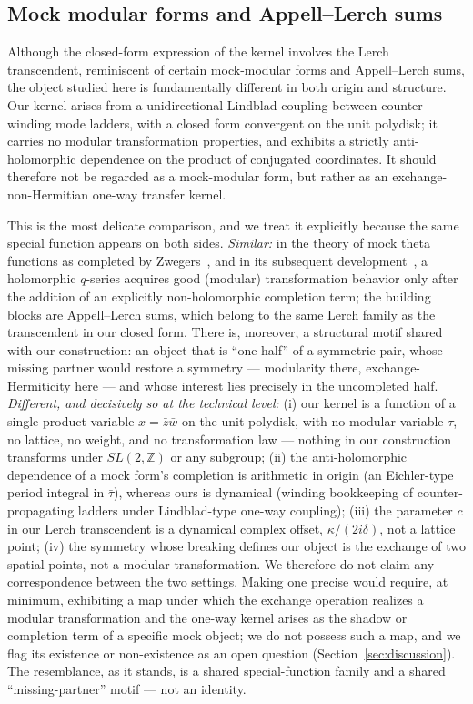 \documentclass[11pt,a4paper]{article}
\newcommand{\zb}{\bar{z}}
\newcommand{\wb}{\bar{w}}
\begin{document}
\subsection{Mock modular forms and Appell--Lerch sums}
\label{sec:mock}

Although the closed-form expression of the kernel involves the Lerch
transcendent, reminiscent of certain mock-modular forms and Appell--Lerch sums,
the object studied here is fundamentally different in both origin and
structure. Our kernel arises from a unidirectional Lindblad coupling between
counter-winding mode ladders, with a closed form convergent on the unit
polydisk; it carries no modular transformation properties, and exhibits a
strictly anti-holomorphic dependence on the product of conjugated coordinates.
It should therefore not be regarded as a mock-modular form, but rather as an
exchange-non-Hermitian one-way transfer kernel.

This is the most delicate comparison, and we treat it explicitly because the
same special function appears on both sides. \emph{Similar:} in the theory of
mock theta functions as completed by Zwegers~\cite{Zwegers2002}, and in its
subsequent development~\cite{Zagier2009,DMZ2012}, a holomorphic $q$-series
acquires good (modular) transformation behavior only after the addition of an
explicitly non-holomorphic completion term; the building blocks are
Appell--Lerch sums, which belong to the same Lerch family as the transcendent
in our closed form. There is, moreover, a structural motif shared with our
construction: an object that is ``one half'' of a symmetric pair, whose missing
partner would restore a symmetry --- modularity there, exchange-Hermiticity
here --- and whose interest lies precisely in the uncompleted half.
\emph{Different, and decisively so at the technical level:} (i) our kernel is a
function of a single product variable $x = \zb\wb$ on the unit polydisk, with
no modular variable $\tau$, no lattice, no weight, and no transformation law
--- nothing in our construction transforms under $SL(2,\mathbb{Z})$ or any
subgroup; (ii) the anti-holomorphic dependence of a mock form's completion is
arithmetic in origin (an Eichler-type period integral in $\bar{\tau}$), whereas
ours is dynamical (winding bookkeeping of counter-propagating ladders under
Lindblad-type one-way coupling); (iii) the parameter $c$ in our Lerch
transcendent is a dynamical complex offset, $\kappa/(2 i \delta)$, not a
lattice point; (iv) the symmetry whose breaking defines our object is the
exchange of two spatial points, not a modular transformation. We therefore do
not claim any correspondence between the two settings. Making one precise would
require, at minimum, exhibiting a map under which the exchange operation
realizes a modular transformation and the one-way kernel arises as the shadow
or completion term of a specific mock object; we do not possess such a map, and
we flag its existence or non-existence as an open question
(Section~\ref{sec:discussion}). The resemblance, as it stands, is a shared
special-function family and a shared ``missing-partner'' motif --- not an
identity.
\end{document}
